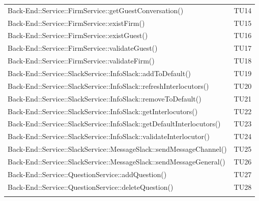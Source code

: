 \documentclass[../PianoDiQualifica_v4.0.0.tex]{subfiles}
\begin{document}
\begin{longtable}[c] {>{\centering\arraybackslash}p{} >{\centering\arraybackslash}p{}}
 			\addlinespace[0.3em]
			\midrule
			\addlinespace[0.3em]
 			Back-End::Service::FirmService::getGuestConversation() & TU14 \\
 			\addlinespace[0.3em]
			\midrule
			\addlinespace[0.3em]
			Back-End::Service::FirmService::existFirm() & TU15 \\
			\addlinespace[0.3em]
			\midrule
			\addlinespace[0.3em]
			Back-End::Service::FirmService::existGuest() & TU16 \\
 			\addlinespace[0.3em]
			\midrule
			\addlinespace[0.3em]
			Back-End::Service::FirmService::validateGuest() & TU17 \\
 			\addlinespace[0.3em]
			\midrule
			\addlinespace[0.3em]
 			Back-End::Service::FirmService::validateFirm() & TU18 \\
 			\addlinespace[0.3em]
			\midrule
			\addlinespace[0.3em]
 			Back-End::Service::SlackService::InfoSlack::addToDefault() & TU19 \\
 			\addlinespace[0.3em]
			\midrule
			\addlinespace[0.3em]
			Back-End::Service::SlackService::InfoSlack::refreshInterlocutors() & TU20 \\
			\addlinespace[0.3em]
			\midrule
			\addlinespace[0.3em]
 			Back-End::Service::SlackService::InfoSlack::removeToDefault() & TU21 \\
 			\addlinespace[0.3em]
			\midrule
			\addlinespace[0.3em]
			Back-End::Service::SlackService::InfoSlack::getInterlocutors() & TU22 \\
 			\addlinespace[0.3em]
			\midrule
			\addlinespace[0.3em]
 			Back-End::Service::SlackService::InfoSlack::getDefaultInterlocutors() & TU23 \\
 			\addlinespace[0.3em]
			\midrule
			\addlinespace[0.3em]
			Back-End::Service::SlackService::InfoSlack::validateInterlocutor() & TU24 \\
 			\addlinespace[0.3em]
			\midrule
			\addlinespace[0.3em]
			Back-End::Service::SlackService::MessageSlack::sendMessageChannel() & TU25 \\
 			\addlinespace[0.3em]
			\midrule
			\addlinespace[0.3em]
 			Back-End::Service::SlackService::MessageSlack::sendMessageGeneral() & TU26 \\
 			\addlinespace[0.3em]
			\midrule
			\addlinespace[0.3em]
 			Back-End::Service::QuestionService::addQuestion() & TU27 \\
 			\addlinespace[0.3em]
			\midrule
			\addlinespace[0.3em]
 			Back-End::Service::QuestionService::deleteQuestion() & TU28 \\
 			\addlinespace[0.3em]

\end{longtable}
\end{document}
